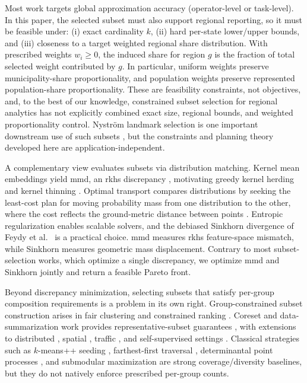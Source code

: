 \documentclass[10pt,journal]{IEEEtran}
\newcommand{\1}{\mathbf{1}}
\theoremstyle{ieeethm}
\begin{document}
Most work targets global approximation accuracy (operator-level or task-level). In this paper, the selected subset must also support regional reporting, so it must be feasible under: (i) exact cardinality $k$, (ii) hard per-state lower/upper bounds, and (iii) closeness to a target weighted regional share distribution. With prescribed weights $w_i\!\ge\!0$, the induced share for region $g$ is the fraction of total selected weight contributed by $g$. In particular, uniform weights preserve municipality-share proportionality, and population weights preserve represented population-share proportionality. These are feasibility constraints, not objectives, and, to the best of our knowledge, constrained subset selection for regional analytics has not explicitly combined exact size, regional bounds, and weighted proportionality control. Nystr\"{o}m landmark selection is one important downstream use of such subsets \cite{williams2001nystrom,gittens2016nystrom,natoleverage2011,alaoui2015rr}, but the constraints and planning theory developed here are application-independent.

A complementary view evaluates subsets via distribution matching. Kernel mean embeddings yield \gls{mmd}, an \gls{rkhs} discrepancy \cite{smola2007hilbert,sriperumbudur2010hilbert,gretton2012kernel,muandet2017kernel}, motivating greedy kernel herding \cite{chen2010herding} and kernel thinning \cite{dwivedi2024kernelthinning}. Optimal transport compares distributions by seeking the least-cost plan for moving probability mass from one distribution to the other, where the cost reflects the ground-metric distance between points \cite{villani2009ot,cuturi2013sinkhorn,peyre2019ot}. Entropic regularization enables scalable solvers, and the debiased Sinkhorn divergence of Feydy et al.\ \cite{feydy2019sinkhorn} is a practical choice. \gls{mmd} measures \gls{rkhs} feature-space mismatch, while Sinkhorn measures geometric mass displacement. Contrary to most subset-selection works, which optimize a single discrepancy, we optimize \gls{mmd} and Sinkhorn jointly and return a feasible Pareto front.

Beyond discrepancy minimization, selecting subsets that satisfy per-group composition requirements is a problem in its own right. Group-constrained subset construction arises in fair clustering and constrained ranking \cite{chierichetti2017fair,bera2019fair,celis2018fair}. Coreset and data-summarization work provides representative-subset guarantees \cite{phillips2016coresets,feldman2020coresets,boutsidis2013nearoptimalcoresets,braverman2022uniformsampling}, with extensions to distributed \cite{lu2020robustcoreset,guo2024fedcore}, spatial \cite{zheng2021kdecoresets}, traffic \cite{hu2023citytraffic}, and self-supervised settings \cite{kim2023opensetcoresetssl}. Classical strategies such as $k$-means++ seeding \cite{arthur2007kmeanspp}, farthest-first traversal \cite{gonzalez1985clustering,harpeled2011geometric}, determinantal point processes \cite{kulesza2012dpp}, and submodular maximization \cite{krause2014submodular,calinescu2011matroid} are strong coverage/diversity baselines, but they do not natively enforce prescribed per-group counts.
\end{document}
